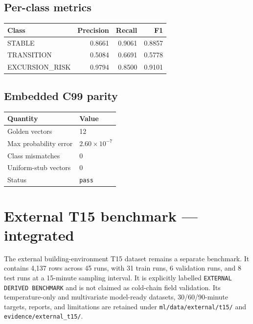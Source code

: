 \documentclass[11pt,a4paper]{article}
\begin{document}
\subsection{Per-class metrics}
\begin{center}
\begin{tabular}{lrrr}
\toprule
\textbf{Class} & \textbf{Precision} & \textbf{Recall} & \textbf{F1} \\
\midrule
STABLE & 0.8661 & 0.9061 & 0.8857 \\
TRANSITION & 0.5084 & 0.6691 & 0.5778 \\
EXCURSION\_RISK & 0.9794 & 0.8500 & 0.9101 \\
\bottomrule
\end{tabular}
\end{center}

\subsection{Embedded C99 parity}
\begin{center}
\begin{tabular}{ll}
\toprule
\textbf{Quantity} & \textbf{Value} \\
\midrule
Golden vectors & 12 \\
Max probability error & $2.60 \times 10^{-7}$ \\
Class mismatches & 0 \\
Uniform-stub vectors & 0 \\
Status & \texttt{pass} \\
\bottomrule
\end{tabular}
\end{center}

\section{External T15 benchmark --- integrated}
The external building-environment T15 dataset remains a separate benchmark.
It contains 4{,}137 rows across 45 runs, with 31 train runs, 6 validation runs,
and 8 test runs at a 15-minute sampling interval. It is explicitly labelled
\texttt{EXTERNAL DERIVED BENCHMARK} and is not claimed as cold-chain field
validation. Its temperature-only and multivariate model-ready datasets,
30/60/90-minute targets, reports, and limitations are retained under
\texttt{ml/data/external/t15/} and \texttt{evidence/external\_t15/}.
\end{document}
